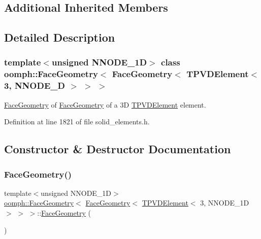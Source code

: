 \subsection*{Additional Inherited Members}


\subsection{Detailed Description}
\subsubsection*{template$<$unsigned N\+N\+O\+D\+E\+\_\+1D$>$\newline
class oomph\+::\+Face\+Geometry$<$ Face\+Geometry$<$ T\+P\+V\+D\+Element$<$ 3, N\+N\+O\+D\+E\+\_\+D $>$ $>$ $>$}

\hyperlink{classoomph_1_1FaceGeometry}{Face\+Geometry} of \hyperlink{classoomph_1_1FaceGeometry}{Face\+Geometry} of a 3D \hyperlink{classoomph_1_1TPVDElement}{T\+P\+V\+D\+Element} element. 

Definition at line 1821 of file solid\+\_\+elements.\+h.



\subsection{Constructor \& Destructor Documentation}
\mbox{\label{classoomph_1_1FaceGeometry_3_01FaceGeometry_3_01TPVDElement_3_013_00_01NNODE__1D_01_4_01_4_01_4_aa9ef718fe118405299ea8deed6d43712}} 
\subsubsection{\texorpdfstring{Face\+Geometry()}{FaceGeometry()}}
{\footnotesize\ttfamily template$<$unsigned N\+N\+O\+D\+E\+\_\+1D$>$ \\
\hyperlink{classoomph_1_1FaceGeometry}{oomph\+::\+Face\+Geometry}$<$ \hyperlink{classoomph_1_1FaceGeometry}{Face\+Geometry}$<$ \hyperlink{classoomph_1_1TPVDElement}{T\+P\+V\+D\+Element}$<$ 3, N\+N\+O\+D\+E\+\_\+1D $>$ $>$ $>$\+::\hyperlink{classoomph_1_1FaceGeometry}{Face\+Geometry} (\begin{DoxyParamCaption}{ }\end{DoxyParamCaption})\hspace{0.3cm}{\ttfamily [inline]}}



